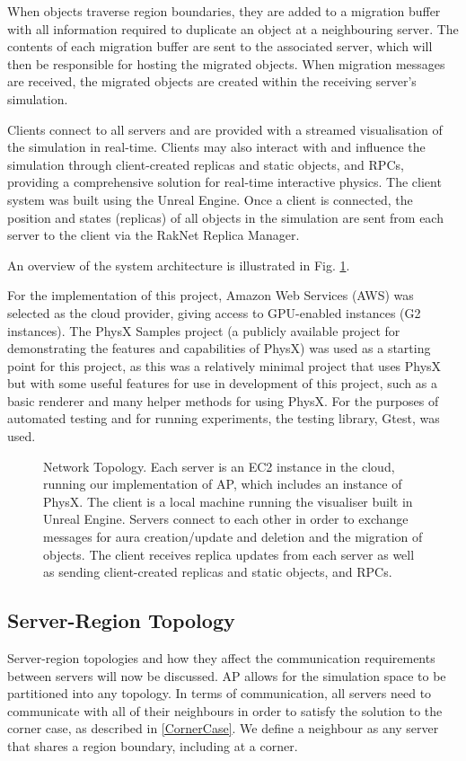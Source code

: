 When objects traverse region boundaries, they are added to a migration buffer with all information required to duplicate an object at a neighbouring server. The contents of each migration buffer are sent to the associated server, which will then be responsible for hosting the migrated objects. When migration messages are received, the migrated objects are created within the receiving server's simulation.

Clients connect to all servers and are provided with a streamed visualisation of the simulation in real-time. Clients may also interact with and influence the simulation through client-created replicas and static objects, and RPCs, providing a comprehensive solution for real-time interactive physics. The client system was built using the Unreal Engine. Once a client is connected, the position and states (replicas) of all objects in the simulation are sent from each server to the client via the RakNet Replica Manager.

An overview of the system architecture is illustrated in Fig. \ref{SystemOverview}.

For the implementation of this project, Amazon Web Services (AWS) was selected as the cloud provider, giving access to GPU-enabled instances (G2 instances). The PhysX Samples project (a publicly available project for demonstrating the features and capabilities of PhysX) was used as a starting point for this project, as this was a relatively minimal project that uses PhysX but with some useful features for use in development of this project, such as a basic renderer and many helper methods for using PhysX. For the purposes of automated testing and for running experiments, the testing library, Gtest, was used.

\begin{figure}[t]
	\centering
	\scalebox{1.5}{}
	\caption{Network Topology. Each server is an EC2 instance in the cloud, running our implementation of AP, which includes an instance of PhysX. The client is a local machine running the visualiser built in Unreal Engine. Servers connect to each other in order to exchange messages for aura creation/update and deletion and the migration of objects. The client receives replica updates from each server as well as sending client-created replicas and static objects, and RPCs.}
	\label{SystemOverview}
\end{figure}

\subsection{Server-Region Topology}\label{Topology}
Server-region topologies and how they affect the communication requirements between servers will now be discussed. 
AP allows for the simulation space to be partitioned into any topology. In terms of communication, all servers need to communicate with all of their neighbours in order to satisfy the solution to the corner case, as described in \ref{CornerCase}. We define a neighbour as any server that shares a region boundary, including at a corner. 


